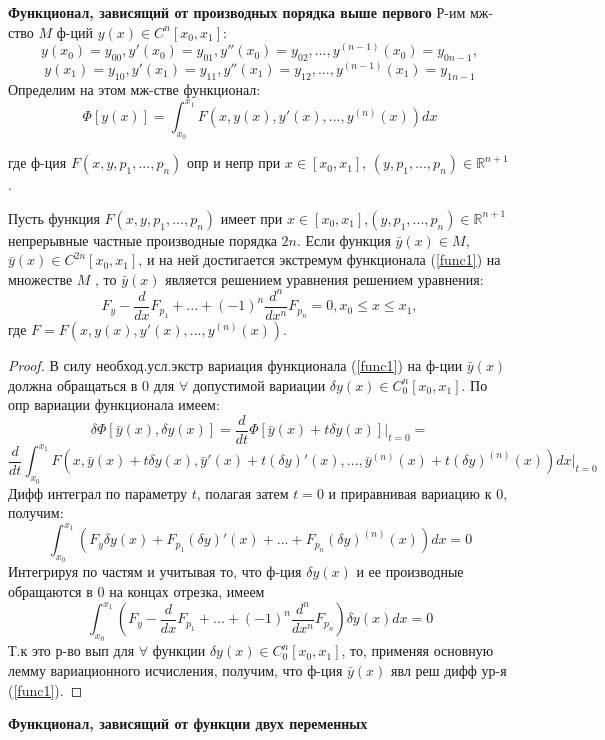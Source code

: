 \textbf{Функционал, зависящий от производных порядка выше
первого}
Р-им мж-ство $M$ ф-ций $y(x) \in C^n[x_0, x_1]:$
$$y(x_0) = y_{00} , y'(x_0) = y_{01}, y''(x_0) = y_{02},..., y^{(n-1)}(x_0) = y_{0n-1},$$
$$y(x_1) = y_{10} , y'(x_1) = y_{11}, y''(x_1) = y_{12},..., y^{(n-1)}(x_1) = y_{1n-1}$$
Определим на этом мж-стве функционал:
\begin{equation}
    \Phi[y(x)]=\int_{x_0}^{x_1}F(x,y(x),y'(x),...,y^{(n)}(x))dx
    \label{func1}
\end{equation}

где ф-ция $F(x,y,p_1,...,p_n)$ опр и непр при $x \in [x_0, x_1]$,
$(y,p_1,..., p_n) \in \mathbb{R}^{n+1}$.
\begin{theorem}
    Пусть функция $F(x,y,p_1,...,p_n)$ имеет при $x\in[x_0, x_1]$,$(y,p_1,..., p_n) \in \mathbb{R}^{n+1}$ непрерывные частные производные порядка $2n$. Если функция $\bar y(x) \in M$, $\bar y(x) \in C^{2n}[x_0, x_1]$, и на ней достигается экстремум функционала (\ref{func1}) на множестве $M$ , то $\bar y(x)$ является решением уравнения
    решением уравнения:
    $$F_y-\frac{d}{dx}F_{p_1}+...+(-1)^n\frac{d^n}{dx^n}F_{p_n}=0, x_0 \leq x \leq x_1,$$
    где $F = F(x,y(x),y'(x),..., y^{(n)}(x))$.
\end{theorem}
\begin{proof}
    В силу необход.усл.экстр вариация
    функционала (\ref{func1}) на ф-ции $\bar y(x)$ должна обращаться в 0 для
    $\forall$ допустимой вариации $\delta y(x) \in C^n_0[x_0, x_1]$.
    По опр вариации функционала имеем:
    $$\delta\Phi[\bar y(x), \delta y(x)]=\frac{d}{dt}\Phi[\bar y(x)+t\delta y(x)]\Big|_{t=0}=$$
    $$\frac{d}{dt}\int_{x_0}^{x_1}F(x,\bar y(x) + t\delta y(x), \bar y'(x)+t(\delta y)'(x),...,\bar y^{(n)}(x)+t(\delta y)^{(n)}(x))dx\Big|_{t=0}$$
    Дифф интеграл по параметру $t$, полагая затем $t = 0$ и приравнивая вариацию к 0, получим:
    $$\int_{x_0}^{x_1}(F_y\delta y(x) + F_{p_1}(\delta y)'(x)+...+F_{p_n}(\delta y)^{(n)}(x))dx=0$$
    Интегрируя по частям и учитывая то, что ф-ция $\delta y(x)$ и ее производные обращаются в 0 на концах отрезка, имеем
    $$\int_{x_0}^{x_1} (F_y-\frac{d}{dx}F_{p_1}+...+(-1)^n\frac{d^n}{dx^n}F_{p_n})\delta y(x) dx=0$$
    Т.к это р-во вып для $\forall$ функции $\delta y(x) \in C^n_0[x_0, x_1]$,
    то, применяя основную лемму вариационного исчисления, получим, что
    ф-ция $\bar y(x)$ явл реш дифф ур-я (\ref{func1}).
\end{proof}
\textbf{Функционал, зависящий от функции двух переменных}

